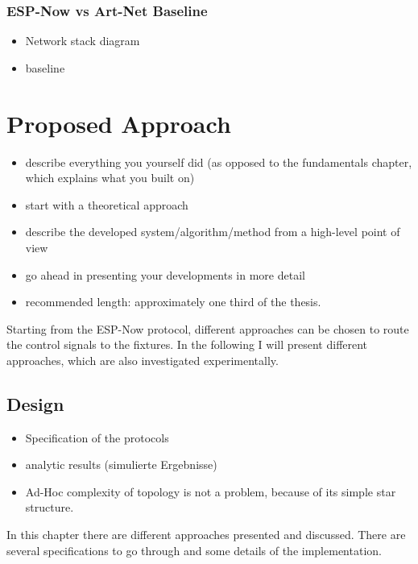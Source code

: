 \documentclass[]{ccs-thesis}
\begin{document}
\subsection{ESP-Now vs Art-Net Baseline}
\begin{itemize}
	\item Network stack diagram
	\item baseline
\end{itemize}


\chapter{Proposed Approach}
\begin{itemize}
\item describe everything you yourself did (as opposed to the fundamentals chapter, which explains what you built on)
\item start with a theoretical approach
\item describe the developed system/algorithm/method from a high-level point of view
\item go ahead in presenting your developments in more detail
\item recommended length: approximately one third of the thesis.
\end{itemize}

Starting from the ESP-Now protocol, different approaches can be chosen to route the control signals to the fixtures. 
In the following I will present different approaches, which are also investigated experimentally.

\section{Design}
\label{sec:design}
\begin{itemize}
	\item Specification of the protocols
	\item analytic results (simulierte Ergebnisse)
	\item Ad-Hoc complexity of topology is not a problem, because of its simple star structure.
\end{itemize}

In this chapter there are different approaches presented and discussed.
There are several specifications to go through and some details of the implementation.
\end{document}
